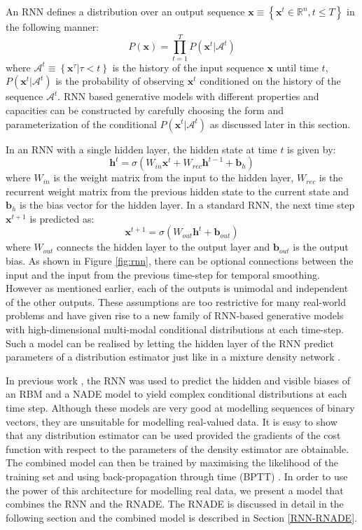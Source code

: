 \documentclass{article} %
\begin{document}
An RNN defines a distribution over an output sequence $ \mathbf{x} \equiv \left\{ \mathbf{x}^t \in \mathbb{R}^n, t \leq T \right\}$ in the following manner:
$$ P(\mathbf{x}) = \prod_{t=1}^{T} P(\mathbf{x}^t|\mathcal{A}^t)$$
where $\mathcal{A}^t \equiv \left\{ \mathbf{x}^{\tau}|\tau < t \right\}$ is the history of the input sequence $\mathbf{x}$ until time $t$, $P(\mathbf{x}^t|\mathcal{A}^t)$ is the probability of observing $\mathbf{x}^t$ conditioned on the history of the sequence $\mathcal{A}^t$. RNN based generative models with different properties and capacities can be constructed by carefully choosing the form and parameterization of the conditional $P(\mathbf{x}^t|\mathcal{A}^t)$ as discussed later in this section. 

In an RNN with a single hidden layer, the hidden state at time $t$ is given by:
\begin{equation}
\label{rnn-hidden}
\mathbf{h}^t = \sigma{(W_{in}\mathbf{x}^t + W_{rec}\mathbf{h}^{t-1} + \mathbf{b}_h)}
\end{equation}
where $W_{in}$ is the weight matrix from the input to the hidden layer, $W_{rec}$ is the recurrent weight matrix from the previous hidden state to the current state and $\mathbf{b}_h$ is the bias vector for the hidden layer. In a standard RNN, the next time step $\mathbf{x}^{t+1}$ is predicted as:
$$ \mathbf{x}^{t+1} = \sigma{(W_{out}\mathbf{h}^{t} + \mathbf{b}_{out})}$$  
where $W_{out}$ connects the hidden layer to the output layer and $\mathbf{b}_{out}$ is the output bias. As shown in Figure \ref{fig:rnn}, there can be optional connections between the input and the input from the previous time-step for temporal smoothing. However as mentioned earlier, each of the outputs is unimodal and independent of the other outputs. 
These assumptions are too restrictive for many real-world problems and have given rise to a new family of RNN-based generative models with high-dimensional multi-modal conditional distributions at each time-step. Such a model can be realised by letting the hidden layer of the RNN predict parameters of a distribution estimator just like in a mixture density network \cite{bishop1994mixture}.  

In previous work \cite{Boulanger-Lewandowski2012}, the RNN was used to predict the hidden and visible biases of an RBM and a NADE model to yield complex conditional distributions at each time step. Although these models are very good at modelling sequences of binary vectors, they are unsuitable for modelling real-valued data. It is easy to show that any distribution estimator can be used provided the gradients of the cost function with respect to the parameters of the density estimator are obtainable. The combined model can then be trained by maximising the likelihood of the training set and using back-propagation through time (BPTT) \cite{rumelhart1985learning}. In order to use the power of this architecture for modelling real data, we present a model that combines the RNN and the RNADE. The RNADE is discussed in detail in the following section and the combined model is described in Section \ref{RNN-RNADE}. 
\end{document}

